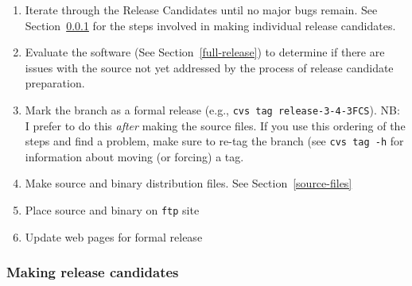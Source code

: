 \documentclass{dods-paper}
\begin{document}
\begin{enumerate}
\begin{enumerate}
\begin{vcode}{ix}
      2. The server dispatch scripts no longer use the Perl HTTP, MIME and
      LWP classes.  Instead, URL dereferencing is done with curl, a
      freestanding binary that is part of the libcurl build.
      ...
    \end{vcode}
  \item Start the process of adding that information to the Guides.
  \end{enumerate}
  It's important to get started on these tasks early because they are
  complicated and, unlike a build or a test suite, there's no automated way to
  determine when they are `ready.'
\item Iterate through the Release Candidates until no major bugs remain. See
  Section~\ref{release-candidate} for the steps involved in making individual
  release candidates.
\item Evaluate the software (See Section~\ref{full-release}) to determine if
  there are issues with the source not yet addressed by the process of
  release candidate preparation.
\item Mark the branch as a formal release
  (e.g., \texttt{cvs tag release-3-4-3FCS}). NB: I prefer to do this
  \emph{after} making the source files. If you use this ordering of
  the steps and find a problem, make sure to re-tag the branch (see
  \texttt{cvs tag -h} for information about moving (or forcing) a tag.
\item Make source and binary distribution files. See Section~\ref{source-files}
\item Place source and binary on \texttt{ftp} site
\item Update web pages for formal release

\end{enumerate}

\subsubsection{Making release candidates}
\label{release-candidate}
\end{document}

